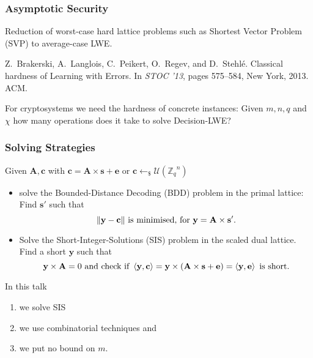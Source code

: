 \documentclass[10pt]{beamer}
\newcommand{\U}[1]{\ensuremath{\mathcal{U}(#1)\xspace}}
\newcommand{\dotp}[2]{\ensuremath{\left\langle {#1},{#2}\right\rangle}\xspace}
\renewcommand{\vec}[1]{\mathbf{#1}\xspace}
\newcommand{\Z}{\ensuremath{\mathbb{Z}}\xspace}
\newcommand{\Zq}{\ensuremath{\Z_q}\xspace}
\newcommand{\sample}{\ensuremath{\leftarrow_{\$}}}
\begin{document}
\begin{frame}
\frametitle{Asymptotic Security}
Reduction of worst-case hard lattice problems such as Shortest Vector Problem (SVP) to average-case LWE.

\vspace{1em}

\begin{thebibliography}{foobar}
Z.\ Brakerski, A.\ Langlois, C.\ Peikert, O.\ Regev, and D.\ Stehl{\'e}.
\newblock Classical hardness of {L}earning with {E}rrors.
\newblock In {\em STOC '13}, pages 575--584, New York, 2013. ACM.
\end{thebibliography}

\pause

\vspace{1em}
 
\begin{block}{For cryptosystems we need the hardness of concrete instances:}
Given $m, n, q$ and $\chi$ how many operations does it take to solve Decision-LWE?
\end{block}



\end{frame}


\begin{frame}
\frametitle{Solving Strategies}

Given $\vec{A},\vec{c}$ with $\vec{c} = \vec{A} \times \vec{s} + \vec{e}$ or $\vec{c} \sample \U{\Zq^n}$

\vspace{1em}

\begin{itemize}

\item solve the Bounded-Distance Decoding (BDD) problem in the primal lattice: Find $\vec{s'}$ such that
\[
 \|\vec{y} - \vec{c}\| \textnormal{ is minimised, for } \vec{y} = \vec{A} \times \vec{s'}.
\]

\pause

\item Solve the Short-Integer-Solutions (SIS) problem in the scaled dual lattice. Find a short $\vec{y}$ such that
\[
 \vec{y} \times \vec{A} = 0 \textnormal{ and check if } \dotp{\vec{y}}{\vec{c}} = \vec{y}\times \left(\vec{A} \times \vec{s} + \vec{e}\right) = \dotp{\vec{y}}{\vec{e}} \textnormal{ is short.}
\]
\end{itemize}

\pause

\begin{block}{In this talk}
\begin{enumerate}
 \item we solve SIS 
 \item we use combinatorial techniques and
 \item we put no bound on $m$.
\end{enumerate}
\end{block}


\end{frame}
\end{document}
